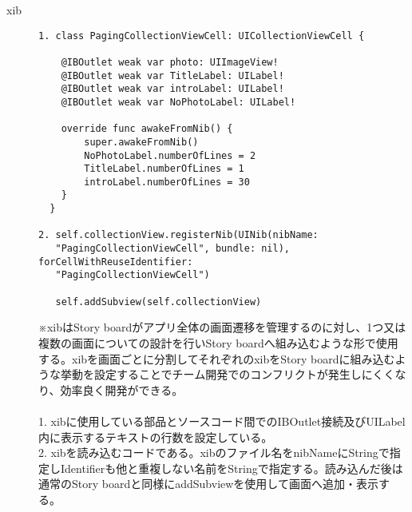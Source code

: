 \begin{description}
\item[xib]\mbox{} 
\begin{lstlisting}[basicstyle=\ttfamily\footnotesize, frame=single]
1. class PagingCollectionViewCell: UICollectionViewCell {
    
    @IBOutlet weak var photo: UIImageView!
    @IBOutlet weak var TitleLabel: UILabel!
    @IBOutlet weak var introLabel: UILabel!
    @IBOutlet weak var NoPhotoLabel: UILabel!
    
    override func awakeFromNib() {
        super.awakeFromNib()
        NoPhotoLabel.numberOfLines = 2
        TitleLabel.numberOfLines = 1
        introLabel.numberOfLines = 30
    }
  }
  
2. self.collectionView.registerNib(UINib(nibName: 
   "PagingCollectionViewCell", bundle: nil), forCellWithReuseIdentifier: 
   "PagingCollectionViewCell")
   
   self.addSubview(self.collectionView)
\end{lstlisting}
※xibはStory boardがアプリ全体の画面遷移を管理するのに対し、1つ又は複数の画面についての設計を行いStory boardへ組み込むような形で使用する。xibを画面ごとに分割してそれぞれのxibをStory boardに組み込むような挙動を設定することでチーム開発でのコンフリクトが発生しにくくなり、効率良く開発ができる。 \\ \\
1. xibに使用している部品とソースコード間でのIBOutlet接続及びUILabel内に表示するテキストの行数を設定している。 \\
2. xibを読み込むコードである。xibのファイル名をnibNameにStringで指定しIdentifierも他と重複しない名前をStringで指定する。読み込んだ後は通常のStory boardと同様にaddSubviewを使用して画面へ追加・表示する。 \\

\end{description}
